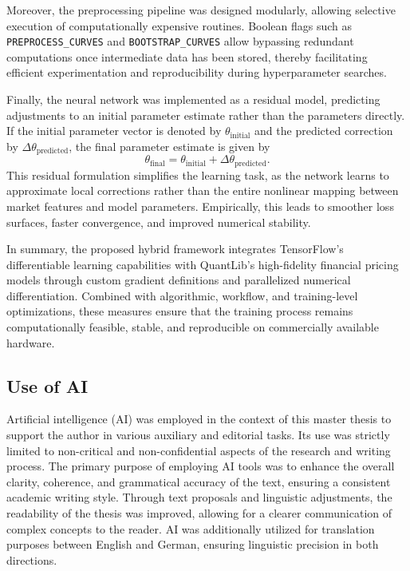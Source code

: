 {Moreover, the preprocessing pipeline was designed modularly, allowing selective execution of computationally expensive routines. Boolean flags such as \texttt{PREPROCESS\_CURVES} and \texttt{BOOTSTRAP\_CURVES} allow bypassing redundant computations once intermediate data has been stored, thereby facilitating efficient experimentation and reproducibility during hyperparameter searches.

Finally, the neural network was implemented as a residual model, predicting adjustments to an initial parameter estimate rather than the parameters directly. If the initial parameter vector is denoted by $\theta_{\text{initial}}$ and the predicted correction by $\Delta \theta_{\text{predicted}}$, the final parameter estimate is given by
\begin{equation}
	\theta_{\text{final}} = \theta_{\text{initial}} + \Delta \theta_{\text{predicted}}.
\end{equation}
This residual formulation simplifies the learning task, as the network learns to approximate local corrections rather than the entire nonlinear mapping between market features and model parameters. Empirically, this leads to smoother loss surfaces, faster convergence, and improved numerical stability.

In summary, the proposed hybrid framework integrates TensorFlow’s differentiable learning capabilities with QuantLib’s high-fidelity financial pricing models through custom gradient definitions and parallelized numerical differentiation. Combined with algorithmic, workflow, and training-level optimizations, these measures ensure that the training process remains computationally feasible, stable, and reproducible on commercially available hardware.

\subsection{Use of AI}
Artificial intelligence (AI) was employed in the context of this master thesis to support the author in various auxiliary and editorial tasks. Its use was strictly limited to non-critical and non-confidential aspects of the research and writing process. The primary purpose of employing AI tools was to enhance the overall clarity, coherence, and grammatical accuracy of the text, ensuring a consistent academic writing style. Through text proposals and linguistic adjustments, the readability of the thesis was improved, allowing for a clearer communication of complex concepts to the reader. AI was additionally utilized for translation purposes between English and German, ensuring linguistic precision in both directions. 

}

